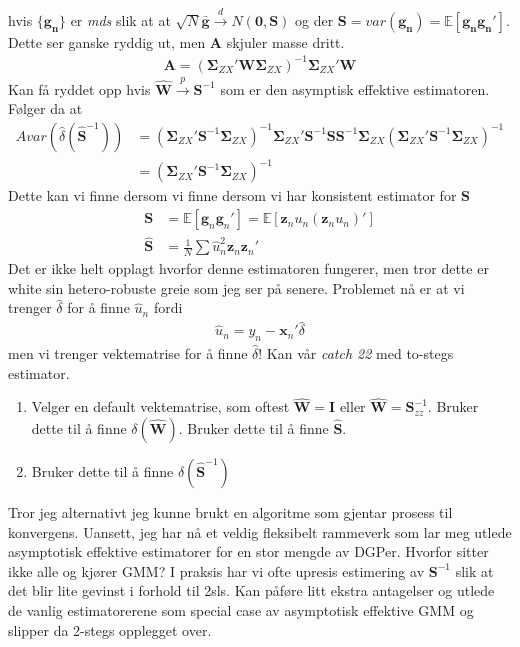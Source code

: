 hvis $\{\mathbf{g_n}\}$ er \textit{mds} slik at at $\sqrt{N}\bar{\mathbf{g}}\overset{d}{\rightarrow} N(\mathbf{0}, \mathbf{S})$ og der $\mathbf{S} = var(\mathbf{g_n}) = \mathbb{E}[\mathbf{g_n}\mathbf{g_n}']$. Dette ser ganske ryddig ut, men $\mathbf{A}$ skjuler masse dritt.
\begin{align}
\mathbf{A} = \left( \mathbf{\Sigma}_{ZX}'\mathbf{W} \mathbf{\Sigma}_{ZX} \right)^{-1} \mathbf{\Sigma}_{ZX}'\mathbf{W}
\end{align}
Kan få ryddet opp hvis $\mathbf{\hat{W}} \overset{p}{\rightarrow} \mathbf{S}^{-1}$ som er den asymptisk effektive estimatoren. Følger da at
\begin{align}
Avar(\hat{\delta}(\hat{\mathbf{S}}^{-1}) )&= \left( \mathbf{\Sigma}_{ZX}'\mathbf{S}^{-1} \mathbf{\Sigma}_{ZX} \right)^{-1} \mathbf{\Sigma}_{ZX}'\mathbf{S}^{-1}\mathbf{S}\mathbf{S}^{-1}\mathbf{\Sigma}_{ZX}\left( \mathbf{\Sigma}_{ZX}'\mathbf{S}^{-1} \mathbf{\Sigma}_{ZX} \right)^{-1} \\
&= \left( \mathbf{\Sigma}_{ZX}'\mathbf{S}^{-1} \mathbf{\Sigma}_{ZX} \right)^{-1}
\end{align}
Dette kan vi finne dersom vi finne dersom vi har konsistent estimator for $\mathbf{S}$
\begin{align}
\mathbf{S} &= \mathbb{E}[\mathbf{g}_n \mathbf{g}_n'] = \mathbb{E}[\mathbf{z}_n u_n(\mathbf{z}_n u_n)'] \\
\hat{\mathbf{S}} &=\frac{1}{N}\sum \hat{u}_n^2 \mathbf{z}_n\mathbf{z}_n'
\end{align}
Det er ikke helt opplagt hvorfor denne estimatoren fungerer, men tror dette er white sin hetero-robuste greie som jeg ser på senere.  Problemet nå er at vi trenger $\hat{\delta}$ for å finne $\hat{u}_n$ fordi
\begin{align}
\hat{u}_n = y_n-\mathbf{x}_n'\hat{\delta}
\end{align}
men vi trenger vektematrise for å finne $\hat{\delta}$! Kan vår \textit{catch 22} med to-stegs estimator.
\begin{enumerate}
\item Velger en default vektematrise, som oftest $\hat{\mathbf{W}} = \mathbf{I}$ eller $\hat{\mathbf{W}} = \mathbf{S}_{zz}^{-1}$. Bruker dette til å finne $\delta(\hat{\mathbf{W}})$. Bruker dette til å finne $\hat{\mathbf{S}}$.
\item Bruker dette til å finne $\delta(\hat{\mathbf{S}}^{-1})$
\end{enumerate}
Tror jeg alternativt jeg kunne brukt en algoritme som gjentar prosess til konvergens. Uansett, jeg har nå et veldig fleksibelt rammeverk som lar meg utlede asymptotisk effektive estimatorer for en stor mengde av DGPer. Hvorfor sitter ikke alle og kjører GMM? I praksis har vi ofte upresis estimering av $\mathbf{S}^{-1}$ slik at det blir lite gevinst i forhold til 2sls. Kan påføre litt ekstra antagelser og utlede de vanlig estimatorerene som special case av asymptotisk effektive GMM og slipper da 2-stegs opplegget over.
